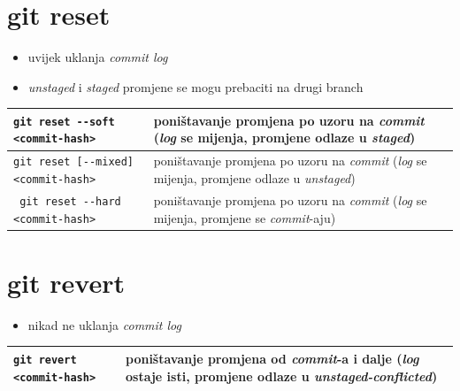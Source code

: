 \documentclass[10pt]{article}
\begin{document}
    \section*{\color{BrickRed} git reset}
    \begin{itemize}
        \item uvijek uklanja \textit{commit log}
        \item \textit{unstaged} i \textit{staged} promjene se mogu prebaciti na drugi branch
    \end{itemize}
    \begin{tabular}{|>{\tt}p{9.25cm}|>{}p{15.50cm}|}
        \hline
        git reset -{}-soft <commit-hash>                & poništavanje promjena po uzoru na \textit{commit} (\textit{log} se mijenja, promjene odlaze u \textit{staged}) \\ \hline
        git reset [-{}-mixed] <commit-hash>             & poništavanje promjena po uzoru na \textit{commit} (\textit{log} se mijenja, promjene odlaze u \textit{unstaged}) \\ \hline
        git reset -{}-hard <commit-hash>                & poništavanje promjena po uzoru na \textit{commit} (\textit{log} se mijenja, promjene se \textit{commit}-aju) \\ \hline
    \end{tabular}

    \section*{\color{BrickRed} git revert}
    \begin{itemize}
        \item nikad ne uklanja \textit{commit log}
    \end{itemize}
    \begin{tabular}{|>{\tt}p{9.25cm}|>{}p{15.50cm}|}
        \hline
        git revert <commit-hash>                        & poništavanje promjena od \textit{commit}-a i dalje (\textit{log} ostaje isti, promjene odlaze u \textit{unstaged-conflicted}) \\ \hline
    \end{tabular}
\end{document}
